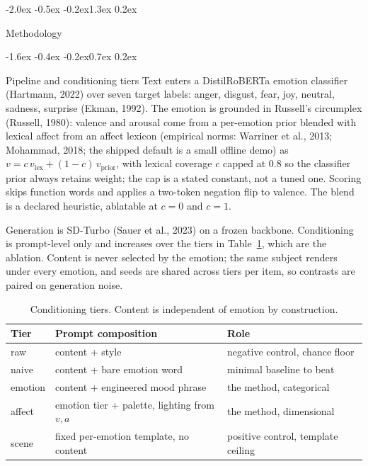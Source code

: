 \documentclass[10pt]{article}
\makeatletter
\renewcommand\section{\@startsection{section}{1}{\z@}%
  {-2.0ex \@plus -0.5ex \@minus -0.2ex}{1.3ex \@plus 0.2ex}{\large\bfseries\raggedright}}
\renewcommand\subsection{\@startsection{subsection}{2}{\z@}%
  {-1.6ex \@plus -0.4ex \@minus -0.2ex}{0.7ex \@plus 0.2ex}{\normalsize\bfseries\raggedright}}
\makeatother
\begin{document}
\section{Methodology}

\subsection{Pipeline and conditioning tiers}
Text enters a DistilRoBERTa emotion classifier (Hartmann, 2022) over seven target labels: anger, disgust, fear, joy, neutral, sadness, surprise (Ekman, 1992). The emotion is grounded in Russell's circumplex (Russell, 1980): valence and arousal come from a per-emotion prior blended with lexical affect from an affect lexicon (empirical norms: Warriner et al., 2013; Mohammad, 2018; the shipped default is a small offline demo) as $v = c\,v_{\mathrm{lex}} + (1-c)\,v_{\mathrm{prior}}$, with lexical coverage $c$ capped at 0.8 so the classifier prior always retains weight; the cap is a stated constant, not a tuned one. Scoring skips function words and applies a two-token negation flip to valence. The blend is a declared heuristic, ablatable at $c=0$ and $c=1$.

Generation is SD-Turbo (Sauer et al., 2023) on a frozen backbone. Conditioning is prompt-level only and increases over the tiers in Table~\ref{tab:tiers}, which are the ablation. Content is never selected by the emotion; the same subject renders under every emotion, and seeds are shared across tiers per item, so contrasts are paired on generation noise.

\begin{table}[t]
\centering\small
\begin{tabular}{l l l}
\hline
\textbf{Tier} & \textbf{Prompt composition} & \textbf{Role} \\
\hline
raw & content + style & negative control, chance floor \\
naive & content + bare emotion word & minimal baseline to beat \\
emotion & content + engineered mood phrase & the method, categorical \\
affect & emotion tier + palette, lighting from $v,a$ & the method, dimensional \\
scene & fixed per-emotion template, no content & positive control, template ceiling \\
\hline
\end{tabular}
\caption{Conditioning tiers. Content is independent of emotion by construction.}
\label{tab:tiers}
\end{table}
\end{document}
